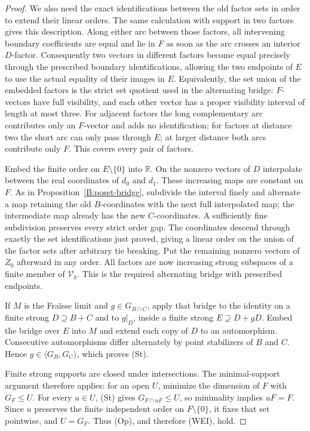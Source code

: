 \begin{proof}
We also need the exact identifications between the old factor sets in
order to extend their linear orders. The same calculation with support
in two factors gives this description. Along either arc between those
factors, all intervening boundary coefficients are equal and lie in
$F$ as soon as the arc crosses an interior $D$-factor. Consequently two
vectors in different factors become equal precisely through the
prescribed boundary identifications, allowing the two endpoints of
$E$ to use the actual equality of their images in $E$. Equivalently,
the set union of the embedded factors is the strict set quotient used
in the alternating bridge: $F$-vectors have full visibility, and each
other vector has a proper visibility interval of length at most three.
For adjacent factors the long complementary arc contributes only an
$F$-vector and adds no identification; for factors at distance two the
short arc can only pass through $E$; at larger distance both arcs
contribute only $F$. This covers every pair of factors.

Embed the finite order on $E\setminus\{0\}$ into $\mathbb R$. On the
nonzero vectors of $D$ interpolate between the real coordinates of
$d_0$ and $d_1$. These increasing maps are constant on $F$. As in
Proposition~\ref{B:poset-bridge}, subdivide the interval finely and
alternate a map retaining the old $B$-coordinates with the next full
interpolated map; the intermediate map already has the new
$C$-coordinates. A sufficiently fine subdivision preserves every
strict order gap. The coordinates descend through exactly the set
identifications just proved, giving a linear order on the union of
the factor sets after arbitrary tie breaking. Put the remaining
nonzero vectors of $Z_0$ afterward in any order. All factors are now
increasing strong subspaces of a finite member of $\mathcal V_k$.
This is the required alternating bridge with prescribed endpoints.

If $M$ is the Fra\"isse limit and $g\in G_{B\cap C}$, apply that bridge
to the identity on a finite strong $D\supseteq B+C$ and to $g|_D$,
inside a finite strong $E\supseteq D+gD$. Embed the bridge over $E$
into $M$ and extend each copy of $D$ to an automorphism. Consecutive
automorphisms differ alternately by point stabilizers of $B$ and $C$.
Hence $g\in\langle G_B,G_C\rangle$, which proves (St).

Finite strong supports are closed under intersections. The
minimal-support argument therefore applies: for an open $U$, minimize
the dimension of $F$ with $G_F\leq U$. For every $u\in U$, (St) gives
$G_{F\cap uF}\leq U$, so minimality implies $uF=F$. Since $u$ preserves
the finite independent order on $F\setminus\{0\}$, it fixes that set
pointwise, and $U=G_F$. Thus (Op), and therefore (WEI), hold.


\end{proof}
